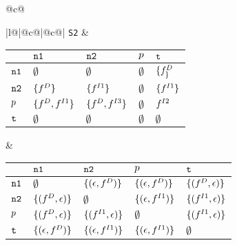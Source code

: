 \begin{figure}
{\begin{tabular}{@{}c@{}}
{\begin{tabular}[b]{|l@{}|@{}c@{}|@{}c@{}|}
{\tt S2} & 
\begin{tabular}{|p{3mm}|p{12mm}p{12mm}p{12mm}p{12mm}|} \hline
            & $\mbox{\tt n1}$  								& $\mbox{\tt n2}$ 				& $p$ 			& $\mbox{\tt t}$ \\ \hline
  $\mbox{\tt n1}$ 	& $\emptyset$							& $\emptyset$			& $\emptyset$	& $\{{f}_{\}}^{D}$ \\ \hline
  $\mbox{\tt n2}$ 	& $\{{f}_{}^{D}\}$					& $\{{f}_{}^{I1}\}$			& $\emptyset$	& $\{{f}_{}^{I1}\}$ \\ \hline
  $p$ 		& $\{{f}_{}^{D}, {f}_{}^{I1}\}$	& $\{{f}_{}^{D}, {f}_{}^{I3}\}$			& $\emptyset$	& ${f}_{}^{I2}$ \\ \hline
  $\mbox{\tt t}$ 	& $\emptyset$							& $\emptyset$			& $\emptyset$	& $\emptyset$ \\ \hline
\end{tabular}
 &
\begin{tabular}{|p{3mm}|p{28mm}p{28mm}p{28mm}p{28mm}|} \hline
			& $\mbox{\tt n1}$  							& $\mbox{\tt n2}$ 							& $p$ 			& $\mbox{\tt t}$ \\ \hline
			 $\mbox{\tt n1}$ 	& $\emptyset$						& $\{(\epsilon, {f}_{}^{D})\}$	& $\{(\epsilon, {f}_{}^{D})\}$	& $\{({f}_{}^{D},\epsilon)\}$ \\ \hline
  $\mbox{\tt n2}$ 	& $\{({f}_{}^{D}, \epsilon)\}$	& $\emptyset$						& $\{(\epsilon, {f}_{}^{I1})\}$	& $\{({f}_{}^{I1}, \epsilon)\}$ \\ \hline
  $p$ 		& $\{({f}_{}^{D}, \epsilon)\}$	& $\{({f}_{}^{I1}, \epsilon)\}$	& $\emptyset$	& $\{({f}_{}^{I1}, \epsilon)\}$ \\ \hline
  $\mbox{\tt t}$ 	& $\{(\epsilon, {f}_{}^{D})\}$		& $\{(\epsilon, {f}_{}^{I1})\}$		& $\{(\epsilon, {f}_{}^{I1})\}$	& $\emptyset$ \\ \hline
\end{tabular} \\ \hline


\end{tabular}}
\end{tabular}}
\end{figure}
